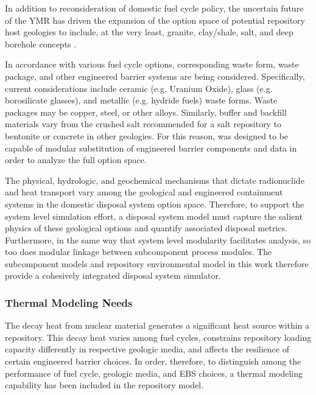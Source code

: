 

In addition to reconsideration of domestic fuel cycle policy, the uncertain 
future of the \gls{YMR} has driven the expansion of the option space of 
potential repository host geologies to include, at the very least, granite, 
clay/shale, salt, and deep borehole concepts \cite{nutt_used_2010}. 


In accordance with various fuel cycle options, corresponding waste form, waste 
package, and other engineered barrier systems are being considered.  
Specifically, current considerations include ceramic (e.g.  Uranium Oxide), 
glass (e.g.  borosilicate glasses), and metallic (e.g.  hydride fuels) waste 
forms. Waste packages may be copper, steel, or other alloys. Similarly, buffer 
and backfill materials vary from the crushed salt recommended for a salt 
repository to bentonite or concrete in other geologies. For this reason, \Cyder
was designed to be capable of modular substitution of engineered barrier 
components and data in order to analyze the full option space.


The physical, hydrologic, and geochemical mechanisms that dictate 
radionuclide and heat transport vary among the geological and engineered 
containment systems in the domestic disposal system option space.  Therefore, 
to support the system level simulation effort, a disposal system model must
capture the salient physics of these geological options and quantify associated 
disposal metrics.  Furthermore, in the same way that system level 
modularity facilitates analysis, so too does modular linkage between subcomponent 
process modules. The subcomponent models and repository environmental model in 
this work therefore provide a cohesively integrated disposal system simulator.


\subsubsection{Thermal Modeling Needs}
The decay heat from nuclear material generates a significant heat source within 
a repository. This decay heat varies among fuel cycles, constrains repository 
loading capacity differently in respective geologic media, and affects the 
resilience of certain engineered barrier choices. In order, therefore, to 
distinguish among the performance of fuel cycle, geologic media, and \gls{EBS} 
choices, a thermal modeling capability has been included in the repository 
model. 

